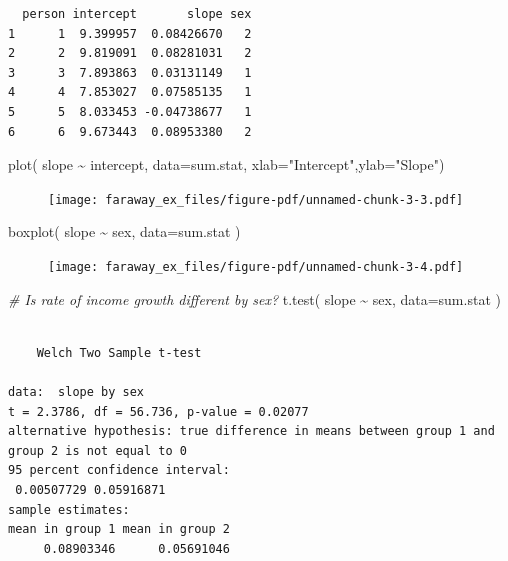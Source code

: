 \documentclass[
  letterpaper,
  DIV=11,
  numbers=noendperiod]{scrreprt}
\newenvironment{Shaded}{\begin{snugshade}}{\end{snugshade}}
\newcommand{\AttributeTok}[1]{\textcolor[rgb]{0.49,0.56,0.16}{#1}}
\newcommand{\CommentTok}[1]{\textcolor[rgb]{0.38,0.63,0.69}{\textit{#1}}}
\newcommand{\FunctionTok}[1]{\textcolor[rgb]{0.02,0.16,0.49}{#1}}
\newcommand{\NormalTok}[1]{\textcolor[rgb]{0.00,0.44,0.13}{#1}}
\newcommand{\SpecialCharTok}[1]{\textcolor[rgb]{0.25,0.44,0.63}{#1}}
\newcommand{\StringTok}[1]{\textcolor[rgb]{0.25,0.44,0.63}{#1}}
\begin{document}
\begin{verbatim}
  person intercept       slope sex
1      1  9.399957  0.08426670   2
2      2  9.819091  0.08281031   2
3      3  7.893863  0.03131149   1
4      4  7.853027  0.07585135   1
5      5  8.033453 -0.04738677   1
6      6  9.673443  0.08953380   2
\end{verbatim}

\begin{Shaded}
\begin{Highlighting}[]
\FunctionTok{plot}\NormalTok{( slope }\SpecialCharTok{\textasciitilde{}}\NormalTok{ intercept, }\AttributeTok{data=}\NormalTok{sum.stat, }\AttributeTok{xlab=}\StringTok{"Intercept"}\NormalTok{,}\AttributeTok{ylab=}\StringTok{"Slope"}\NormalTok{)}
\end{Highlighting}
\end{Shaded}

\begin{figure}[H]

{\centering \texttt{[image: faraway\_ex\_files/figure-pdf/unnamed-chunk-3-3.pdf]}

}

\end{figure}

\begin{Shaded}
\begin{Highlighting}[]
\FunctionTok{boxplot}\NormalTok{( slope }\SpecialCharTok{\textasciitilde{}}\NormalTok{ sex, }\AttributeTok{data=}\NormalTok{sum.stat )}
\end{Highlighting}
\end{Shaded}

\begin{figure}[H]

{\centering \texttt{[image: faraway\_ex\_files/figure-pdf/unnamed-chunk-3-4.pdf]}

}

\end{figure}

\begin{Shaded}
\begin{Highlighting}[]
\CommentTok{\# Is rate of income growth different by sex?}
\FunctionTok{t.test}\NormalTok{( slope }\SpecialCharTok{\textasciitilde{}}\NormalTok{ sex, }\AttributeTok{data=}\NormalTok{sum.stat )}
\end{Highlighting}
\end{Shaded}

\begin{verbatim}

    Welch Two Sample t-test

data:  slope by sex
t = 2.3786, df = 56.736, p-value = 0.02077
alternative hypothesis: true difference in means between group 1 and group 2 is not equal to 0
95 percent confidence interval:
 0.00507729 0.05916871
sample estimates:
mean in group 1 mean in group 2 
     0.08903346      0.05691046 
\end{verbatim}
\end{document}
